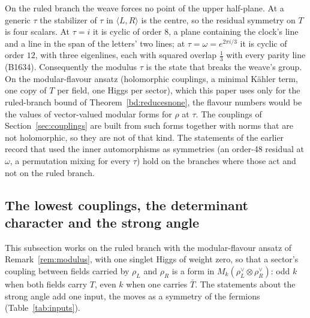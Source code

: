 \begin{remark}\label{rem:modulus}
On the ruled branch the weave forces no point of the upper half-plane. At a generic $\tau$ the stabilizer of $\tau$ in
$\langle L,R\rangle$ is the centre, so the residual symmetry on $T$ is four scalars. At $\tau=i$ it is cyclic of order $8$,
a plane containing the clock's line and a line in the span of the letters' two lines; at $\tau=\omega=e^{2\pi i/3}$ it is cyclic of order $12$, with
three eigenlines, each with squared overlap $\tfrac13$ with every parity line (B1634). Consequently the modulus $\tau$ is the state that
breaks the weave's group. On the modular-flavour ansatz (holomorphic couplings, a minimal K\"ahler term, one copy of $T$
per field, one Higgs per sector), which this paper uses only for the ruled-branch bound of Theorem~\ref{bd:reducesnone},
the flavour numbers would be the values of vector-valued modular forms for $\rho$ at $\tau$. The couplings of
Section~\ref{sec:couplings} are built from such forms together with norms that are not holomorphic, so they are not of that
kind. The
statements of the earlier record that used the inner automorphisms as symmetries (an order-48 residual at $\omega$, a
permutation mixing for every $\tau$) hold on the branches where those act and not on the ruled branch.
\end{remark}

\subsection{The lowest couplings, the determinant character and the strong angle}\label{sec:anomaly}

This subsection works on the ruled branch with the modular-flavour ansatz of Remark~\ref{rem:modulus}, with one singlet
Higgs of weight zero, so that a sector's coupling between fields carried by $\rho_L$ and $\rho_R$ is a form in
$M_k(\rho_L^\vee\otimes\rho_R^\vee)$: odd $k$ when both fields carry $T$, even $k$ when one carries $\bar T$. The
statements about the strong angle add one input, the moves as a symmetry of the fermions (Table~\ref{tab:inputs}).


